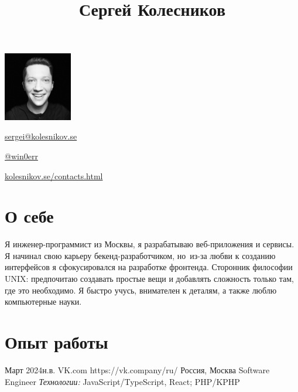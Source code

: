 \documentclass[10pt]{article}
\begin{document}
\begin{floatingfigure}[r]{3cm}
	\vspace{-.5\baselineskip}
	\includegraphics[width=3cm]{userpic}
\end{floatingfigure}

\title{Сергей Колесников}
\vspace{-.5\baselineskip}

\begin{horizontalitemize}
	\item \href{mailto:sergei@kolesnikov.se}{sergei@kolesnikov.se}
	\item \href{https://t.me/win0err}{@win0err}
	\item \href{https://kolesnikov.se/contacts.html}{kolesnikov.se/contacts.html}
\end{horizontalitemize}

\begin{summary}
\end{summary}


\vspace{-2\baselineskip}
\section{О себе}

Я инженер-программист из Москвы, я разрабатываю веб-приложения и сервисы.
Я начинал свою карьеру бекенд-разработчиком, но~из-за любви к созданию интерфейсов я сфокусировался на разработке фронтенда.
Сторонник философии UNIX: предпочитаю создавать простые вещи и добавлять сложность только там, где это необходимо.
Я быстро учусь, внимателен к деталям, а также люблю компьютерные науки.


\section{Опыт работы}

\job
	{Март 2024}{н.в.}
	{VK.com}
	{https://vk.company/ru/}  %
	{Россия, Москва}
	{Software Engineer}
	{
	  \textit{Технологии:} JavaScript/TypeScript, React; PHP/KPHP
	}
\end{document}
